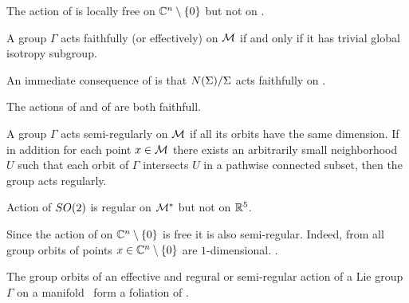 \begin{example}
The action  of  is locally free on $\mathbb{C}^{n}\setminus\{0\}$ but not on .
\end{example}

\begin{definition}
\label{def:faithfull}
A group $\Gamma$ acts faithfully (or effectively) on $\mathcal{M}$ if and only if it has trivial global isotropy subgroup.
\end{definition}

An immediate consequence of  is that $N(\Sigma)/\Sigma$ acts faithfully on \Fix{\Sigma}.


\begin{example}
 The actions  of  and  of  are both faithfull. 
\end{example}

\begin{definition}
\label{def:regular}
A group $\Gamma$ acts semi-regularly on $\mathcal{M}$ if all its orbits have the same dimension. 
If in addition for each point $x\in \mathcal{M}$
there exists an arbitrarily small neighborhood $U$ such that each orbit of $\Gamma$ intersects $U$ in a pathwise connected subset, then the group
acts regularly.
\end{definition}

\begin{example}
 Action  of $SO(2)$ is regular on $\mathcal{M}^*$ but not on $\mathbb{R}^{5}$.
\end{example}


\begin{example}
Since the action  of  on $\mathbb{C}^{n}\setminus\{0\}$ is free it is also semi-regular. Indeed, from  all group orbits of points $x\in\mathbb{C}^{n}\setminus\{0\}$ are $1$-dimensional.
.
\end{example}

The group orbits of an effective and regural or semi-regular action of a Lie group $\Gamma$ on a manifold \Manif\ form a foliation of \Manif{}. 







